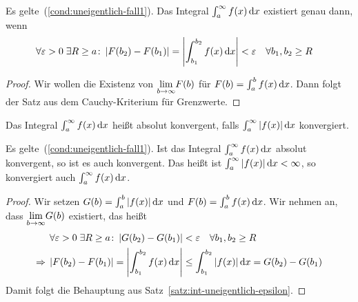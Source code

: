 \begin{satz} %
    \label{satz:int-uneigentlich-epsilon}
    Es gelte~(\ref{cond:uneigentlich-fall1}). Das Integral $ \int_{a}^{\infty} f\of{x} \dif x$ existiert genau dann, wenn
    \begin{align*}
        \forall\varepsilon > 0\ex R\geq a\colon \abs{F\of{b_2} - F\of{b_1}} &= \abs{ \int_{b_1}^{b_2} f\of{x} \dif x} < \varepsilon\quad\forall b_1, b_2 \geq R
    \end{align*}
    \begin{proof}
        Wir wollen die Existenz von $\biglim{b\toinf} F\of{b}$ für $F\of{b} = \int_{a}^{b} f\of{x} \dif x$. Dann folgt der Satz aus dem Cauchy-Kriterium für Grenzwerte.
    \end{proof}
\end{satz}

\begin{definition}
    Das Integral $\int_{a}^{\infty} f\of{x} \dif x$ heißt absolut konvergent, falls $\int_{a}^{\infty} \abs{f\of{x}} \dif x$ konvergiert.
\end{definition}


\begin{satz}
    Es gelte~(\ref{cond:uneigentlich-fall1}). Ist das Integral $\int_{a}^{\infty} f\of{x} \dif x$ absolut konvergent, so ist es auch konvergent. Das heißt ist $ \int_{a}^{\infty} \abs{f\of{x}} \dif x < \infty$, so konvergiert auch $ \int_{a}^{\infty} f\of{x} \dif x$.
    \begin{proof}
        Wir setzen $G\of{b} = \int_{a}^{b} \abs{f\of{x}} \dif x$ und $F\of{b} = \int_{a}^{b} f\of{x} \dif x$. Wir nehmen an, dass $\biglim{b\toinf} G\of{b}$ existiert, das heißt
        \begin{align*}
            \forall\varepsilon > 0\ex R\geq a\colon \abs{G\of{b_2} - G\of{b_1}} &< \varepsilon\quad\forall b_1, b_2\geq R\\
            \impl \abs{F\of{b_2} - F\of{b_1}} = \abs{ \int_{b_1}^{b_2} f\of{x} \dif x} &\leq \int_{b_1}^{b_2} \abs{f\of{x}} \dif x = G\of{b_2} - G\of{b_1}
        \end{align*}
        Damit folgt die Behauptung aus Satz~\ref{satz:int-uneigentlich-epsilon}.
    \end{proof}
\end{satz}

\newpage

